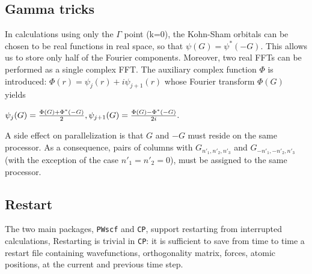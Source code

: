 \documentclass[12pt,a4paper]{article}
\begin{document}
\subsection{Gamma tricks}

In calculations using only the $\Gamma$ point (k=0),
the Kohn-Sham orbitals can be chosen to be real functions in 
real space, so that 
$
  \psi(G) = \psi^*(-G).
$
This allows us to store only half of the Fourier components.
Moreover, two real FFTs can be performed as a single complex FFT.
The auxiliary complex function $\Phi$ is introduced:
$
    \Phi(r) = \psi_j(r)+ i \psi_{j+1}(r)
$
whose Fourier transform $\Phi(G)$ yields

$
   \psi_j    (G) =  {\Phi(G) + \Phi^*(-G)\over 2},
   \psi_{j+1}(G) =  {\Phi(G) - \Phi^*(-G)\over 2i}.
$

A side effect on parallelization is that $G$ and $-G$ must
reside on the same processor. As a consequence, pairs of columns
with $G_{n'_1,n'_2,n'_3}$ and $G_{-n'_1,-n'_2,n'_3}$
(with the exception of the case $n'_1=n'_2=0$),
must be assigned to the same processor.

\subsection{Restart}
The two main packages, \texttt{PWscf} and \texttt{CP}, support
restarting from interrupted calculations, Restarting is trivial
in \texttt{CP}: it is sufficient to save from time to time a 
restart file containing wavefunctions, orthogonality matrix, 
forces, atomic positions, at the current and previous time step.
\end{document}
